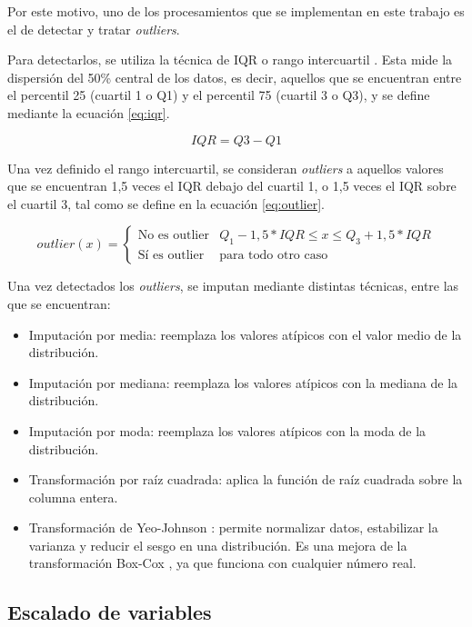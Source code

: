 Por este motivo, uno de los procesamientos que se implementan en este trabajo es el de detectar y tratar \textit{outliers}.

Para detectarlos, se utiliza la técnica de IQR o rango intercuartil \citep{article:iqr}. Esta mide la dispersión del 50\% central de los datos, es decir, aquellos que se encuentran entre el percentil 25 (cuartil 1 o Q1) y el percentil 75 (cuartil 3 o Q3), y se define mediante la ecuación \ref{eq:iqr}.

\begin{equation}
	\label{eq:iqr}
	IQR = Q3 - Q1
\end{equation}

Una vez definido el rango intercuartil, se consideran \textit{outliers} a aquellos valores que se encuentran 1,5 veces el IQR debajo del cuartil 1, o 1,5 veces el IQR sobre el cuartil 3, tal como se define en la ecuación \ref{eq:outlier}.

\begin{equation}
    \label{eq:outlier}
    outlier(x) = 
\begin{cases}
    \text{No es outlier} & Q_1 - 1,5*IQR \le x \le Q_3 + 1,5*IQR \\
    \text{Sí es outlier} &  \text{para todo otro caso }
\end{cases}
\end{equation}

Una vez detectados los \textit{outliers}, se imputan mediante distintas técnicas, entre las que se encuentran:

\begin{itemize}
\item Imputación por media: reemplaza los valores atípicos con el valor medio de la distribución.
\item Imputación por mediana: reemplaza los valores atípicos con la mediana de la distribución.
\item Imputación por moda: reemplaza los valores atípicos con la moda de la distribución.
\item Transformación por raíz cuadrada: aplica la función de raíz cuadrada sobre la columna entera.
\item Transformación de Yeo-Johnson \citep{article:yeojohnson}: permite normalizar datos, estabilizar la varianza y reducir el sesgo en una distribución. Es una mejora de la transformación Box-Cox \citep{article:boxcox}, ya que funciona con cualquier número real.
\end{itemize}

\subsection{Escalado de variables}

